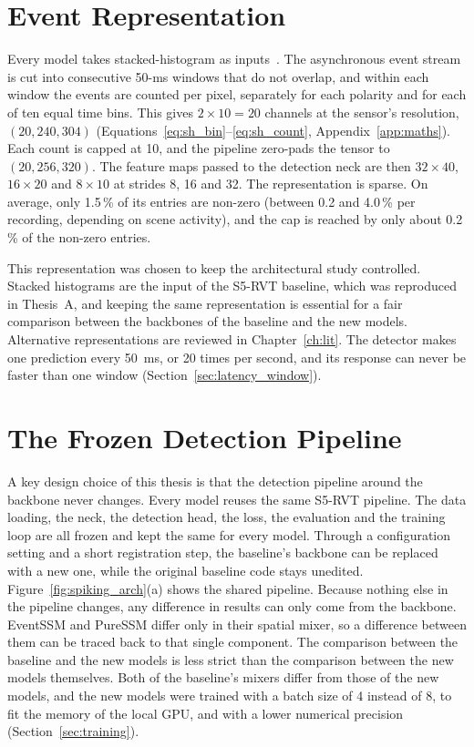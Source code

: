 \documentclass[11pt, a4paper]{report}
\begin{document}
\section{Event Representation}
\label{sec:repr}
Every model takes stacked-histogram as inputs~\cite{gehrig2023recurrent}. The
asynchronous event stream is cut into consecutive 50-ms windows that do not overlap, and within each window the events are counted per
pixel, separately for each polarity and for each of ten equal time bins. This gives $2 \times 10 = 20$
channels at the sensor's resolution, $(20, 240, 304)$
(Equations~\eqref{eq:sh_bin}--\eqref{eq:sh_count}, Appendix~\ref{app:maths}). Each count is capped at 10,
and the pipeline zero-pads the tensor to $(20, 256, 320)$. The feature maps passed to the detection neck
are then $32\times40$, $16\times20$ and $8\times10$ at strides 8, 16 and 32. The representation is sparse. On average, only 1.5\,\% of its entries are non-zero (between 0.2 and 4.0\,\% per recording, depending on
scene activity), and the cap is reached by only about 0.2\,\% of the non-zero entries.

This representation was chosen to keep the architectural study controlled. Stacked histograms are the
input of the S5-RVT baseline, which was reproduced in Thesis~A, and keeping the same representation is
essential for a fair comparison between the backbones of the baseline and the new models. Alternative
representations are reviewed in Chapter~\ref{ch:lit}. The detector
makes one prediction every 50~ms, or 20 times per second, and its response can never be faster than one
window (Section~\ref{sec:latency_window}).
\section{The Frozen Detection Pipeline}
\label{sec:frozen_pipeline}
A key design choice of this thesis is that the detection pipeline around the backbone never changes. Every
model reuses the same S5-RVT pipeline. The data loading, the neck, the detection head, the loss, the
evaluation and the training loop are all frozen and kept the same for every model. Through a configuration
setting and a short registration step, the baseline's backbone can be replaced with a new one, while the
original baseline code stays unedited. Figure~\ref{fig:spiking_arch}(a) shows the shared pipeline. Because
nothing else in the pipeline changes, any difference in results can only come from the backbone. EventSSM
and PureSSM differ only in their spatial mixer, so a difference between them can be traced back to that
single component. The comparison between the baseline and the new models is less strict than the
comparison between the new models themselves. Both of the baseline's mixers differ from those of the new
models, and the new models were trained with a batch size of 4 instead of 8, to fit the memory of the local
GPU, and with a lower numerical precision (Section~\ref{sec:training}).
\end{document}

